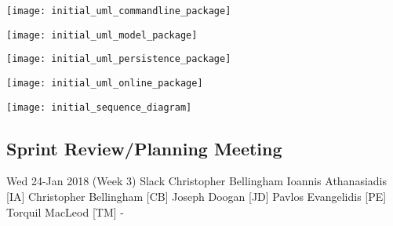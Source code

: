 \begin{center}
	\texttt{[image: initial\_uml\_commandline\_package]}
	\label{figure:initial_uml_commandline_package}
\end{center}

\begin{center}
	\texttt{[image: initial\_uml\_model\_package]}
	\label{figure:initial_uml_model_package}
\end{center}

\begin{center}
	\texttt{[image: initial\_uml\_persistence\_package]}
	\label{figure:initial_uml_persistence_package}
\end{center}

\begin{center}
	\texttt{[image: initial\_uml\_online\_package]}
	\label{figure:initial_uml_online_package}
\end{center}

\begin{center}
	\texttt{[image: initial\_sequence\_diagram]}
	\label{figure:initial_sequence_diagram}
\end{center}


\newpage
\subsection{Sprint Review/Planning Meeting}
\label{appendix:sprint2_planning_meeting}

\momtoptable
{Wed 24-Jan 2018 (Week 3)}
{Slack}
{Christopher Bellingham}
{Ioannis Athanasiadis [IA]\newline
Christopher Bellingham [CB]\newline
Joseph Doogan [JD]\newline
Pavlos Evangelidis [PE]\newline
Torquil MacLeod [TM]}
{-}

